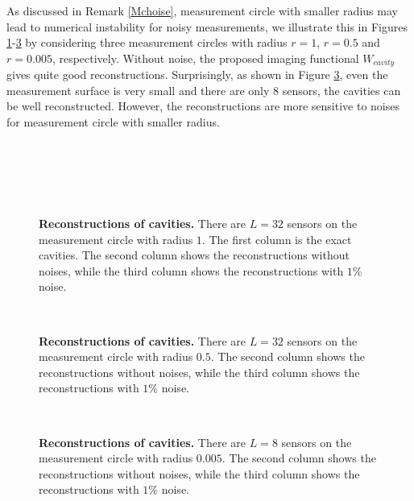 \documentclass[final]{siamltex}
\begin{document}
As discussed in  Remark \ref{Mchoise}, measurement circle with smaller radius may lead to numerical instability for noisy measurements, we illustrate this in Figures \ref{cavities}-\ref{cavities0005} by considering three measurement circles with radius $r=1$, $r=0.5$ and $r=0.005$, respectively.  Without noise, the proposed imaging functional $W_{cavity}$ gives quite good reconstructions. Surprisingly, as shown in Figure \ref{cavities0005}, even the measurement surface is very small and there are only $8$ sensors, the cavities can be well reconstructed. However, the reconstructions are more sensitive to noises for measurement circle with smaller radius.

\begin{figure}[htbp]
  \centering
  \\
\\
  \\
\\
\caption{{\bf Reconstructions of cavities.} There are $L=32$ sensors on the measurement circle with radius $1$. The first column is the exact cavities. The second column shows the reconstructions without noises, while the third column shows the reconstructions with $1\%$ noise.}
\label{cavities}
\end{figure}

\begin{figure}[htbp]
  \centering
  \\
\caption{{\bf Reconstructions of cavities.} There are $L=32$ sensors on the measurement circle with radius $0.5$.  The second column shows the reconstructions without noises, while the third column shows the reconstructions with $1\%$ noise.}
\label{cavities05}
\end{figure}

\begin{figure}[htbp]
  \centering

  \\
\caption{{\bf Reconstructions of cavities.} There are $L=8$ sensors on the measurement circle with radius $0.005$. The second column shows the reconstructions without noises, while the third column shows the reconstructions with $1\%$ noise.}
\label{cavities0005}
\end{figure}
\end{document}

